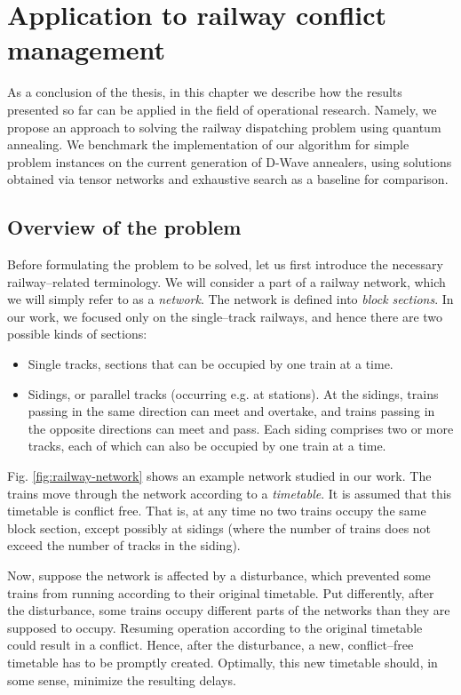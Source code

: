 \chapter{Application to railway conflict management}

As a conclusion of the thesis, in this chapter we describe how the results presented so far can be
applied in the field of operational research. Namely, we propose an approach to solving the railway
dispatching problem using quantum annealing. We benchmark the implementation of our algorithm for
simple problem instances on the current generation of D-Wave annealers, using solutions obtained via
tensor networks and exhaustive search as a baseline for comparison.


\section{Overview of the problem}
Before formulating the problem to be solved, let us first introduce the necessary railway--related
terminology. We will consider a part of a railway network, which we will simply refer to as a
\emph{network}. The network is defined into \emph{block sections}. In our work, we focused only on
the single--track railways, and hence there are two possible kinds of sections:
\begin{itemize}
    \item Single tracks, sections that can be occupied by one train at a time.
    \item Sidings, or parallel tracks (occurring e.g. at stations). At the sidings, trains passing in
      the same direction can meet and overtake, and trains passing in the opposite directions can
      meet and pass. Each siding comprises two or more tracks, each of which can also be occupied by
      one train at a time.
\end{itemize}

Fig. \ref{fig:railway-network} shows an example network studied in our work. The trains move through
the network according to a \emph{timetable}. It is assumed that this timetable is conflict free.
That is, at any time no two trains occupy the same block section, except possibly at sidings (where
the number of trains does not exceed the number of tracks in the siding).

Now, suppose the network is affected by a disturbance, which prevented some trains from running
according to their original timetable. Put differently, after the disturbance, some trains occupy
different parts of the networks than they are supposed to occupy. Resuming operation according to
the original timetable could result in a conflict. Hence, after the disturbance, a new,
conflict--free timetable has to be promptly created. Optimally, this new timetable should, in some
sense, minimize the resulting delays.

